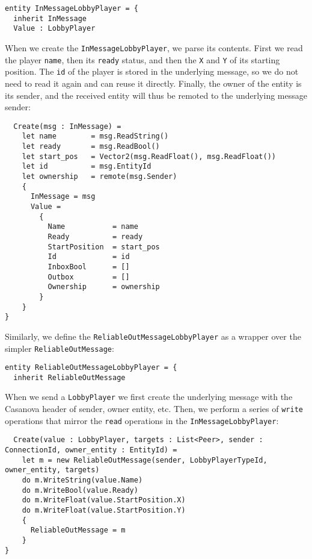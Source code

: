 \begin{lstlisting}
entity InMessageLobbyPlayer = {
  inherit InMessage
  Value : LobbyPlayer
\end{lstlisting}

When we create the \texttt{InMessageLobbyPlayer}, we parse its contents. First we read the player \texttt{name}, then its \texttt{ready} status, and then the \texttt{X} and \texttt{Y} of its starting position. The \texttt{id} of the player is stored in the underlying message, so we do not need to read it again and can reuse it directly. Finally, the owner of the entity is its sender, and the received entity will thus be remoted to the underlying message sender:

\begin{lstlisting}
  Create(msg : InMessage) =
    let name        = msg.ReadString()
    let ready       = msg.ReadBool()
    let start_pos   = Vector2(msg.ReadFloat(), msg.ReadFloat())
    let id          = msg.EntityId
    let ownership   = remote(msg.Sender)
    {
      InMessage = msg
      Value =
        {
          Name           = name
          Ready          = ready
          StartPosition  = start_pos
          Id             = id
          InboxBool      = []
          Outbox         = []
          Ownership      = ownership
        }
    }
}
\end{lstlisting}

Similarly, we define the \texttt{ReliableOutMessageLobbyPlayer} as a wrapper over the simpler \texttt{ReliableOutMessage}:

\begin{lstlisting}
entity ReliableOutMessageLobbyPlayer = {
  inherit ReliableOutMessage
\end{lstlisting}

When we send a \texttt{LobbyPlayer} we first create the underlying message with the Casanova header of sender, owner entity, etc. Then, we perform a series of \texttt{write} operations that mirror the \texttt{read} operations in the \texttt{InMessageLobbyPlayer}:

\begin{lstlisting}
  Create(value : LobbyPlayer, targets : List<Peer>, sender : ConnectionId, owner_entity : EntityId) =
    let m = new ReliableOutMessage(sender, LobbyPlayerTypeId, owner_entity, targets)
    do m.WriteString(value.Name)
    do m.WriteBool(value.Ready)
    do m.WriteFloat(value.StartPosition.X)
    do m.WriteFloat(value.StartPosition.Y)
    {
      ReliableOutMessage = m
    }
}
\end{lstlisting}


